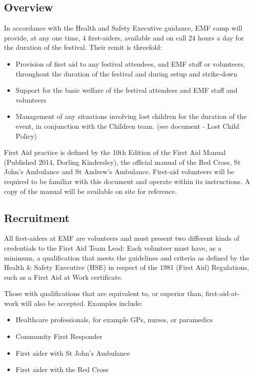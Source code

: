 \subsection{Overview}
In accordance with the Health and Safety Executive guidance, EMF camp will
provide, at any one time, 4 first-aiders, available and on call 24 hours a day
for the duration of the festival. Their remit is threefold:

\begin{itemize}
  \item Provision of first aid to any festival attendees, and EMF staff or
  volunteers, throughout the duration of the festival and during setup and
  strike-down
  \item Support for the basic welfare of the festival attendees and EMF
  staff and volunteers
  \item Management of any situations involving lost children for the duration of
  the event, in conjunction with the Children team. (see document - Lost Child Policy)
\end{itemize}

First Aid practice is defined by the 10th Edition of the First Aid Manual
(Published 2014, Dorling Kindersley), the official manual of the Red Cross, St
John’s Ambulance and St Andrew’s Ambulance. First-aid volunteers will be
required to be familiar with this document and operate within its instructions.
A copy of the manual will be available on site for reference.


\subsection{Recruitment}
All first-aiders at EMF are volunteers and must present two different kinds of
credentials to the First Aid Team Lead: Each volunteer must have, as a minimum,
a qualification that meets the guidelines and criteria as defined by the Health
\& Safety Executive (HSE) in respect of the 1981 (First Aid) Regulations, such
as a First Aid at Work certificate.

Those with qualifications that are equivalent to, or superior than,
first-aid-at-work will also be accepted. Examples include:

\begin{itemize}
  \item Healthcare professionals, for example GPs, nurses, or paramedics
  \item Community First Responder
  \item First aider with St John’s Ambulance
  \item First aider with the Red Cross
\end{itemize}


